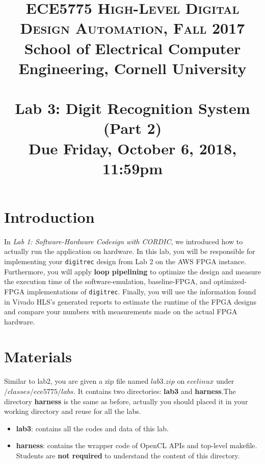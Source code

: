 \documentclass[paper=letter, fontsize=11.6pt]{scrartcl} %
\title{	
\normalfont \normalsize 
\textsc{ECE5775 High-Level Digital Design Automation, Fall 2017} \\  
School of Electrical Computer Engineering, Cornell University \\ [11pt]%
\horrule{0.5pt} \\[0.4cm] %
\large Lab 3: Digit Recognition System (Part 2) \\ %
\small Due Friday, October 6, 2018, 11:59pm
\horrule{0.5pt} \\[0.5cm] %
\vspace{-15ex}}
\date{}
\numberwithin{equation}{section} %
\numberwithin{figure}{section} %
\numberwithin{table}{section} %
\begin{document}

\maketitle %

\section{Introduction}

In \textit{Lab 1: Software-Hardware Codesign with CORDIC}, we introduced how to actually run the application on hardware.
In this lab, you will be responsible for implementing your \texttt{digitrec}
design from Lab 2 on the AWS FPGA instance.
Furthermore, you will apply \textbf{loop pipelining}
to optimize the design and measure the execution time of the software-emulation,
baseline-FPGA, and optimized-FPGA implementations of \texttt{digitrec}.
Finally, you will use the information found in Vivado HLS's generated reports
to estimate the runtime of the FPGA designs and compare your numbers
with measurements made on the actual FPGA hardware.

\section{Materials}
Similar to lab2, you are given a zip file named 
$lab3.zip$ on $ecelinux$ under $/classes/ece5775/labs$. It contains two directories: \textbf{lab3} and \textbf{harness}.The directory \textbf{harness} is the same as before, actually you should placed it in your working directory and reuse for all the labs.

\begin{itemize}
	\item \textbf{lab3}: contains all the codes and data of this lab.
	\item \textbf{harness}: contains the wrapper code of OpenCL APIs and top-level makefile. Students are \textbf{not required} to understand the content of this directory.
\end{itemize}
\end{document}
